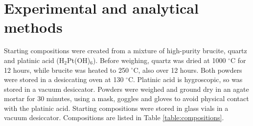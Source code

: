 \documentclass[review]{elsarticle}
\begin{document}
\section{Experimental and analytical methods}
Starting compositions were created from a mixture of high-purity brucite, quartz and platinic acid (H$_2$Pt(OH)$_6$). Before weighing, quartz was dried at 1000 $^{\circ}$C for 12 hours, while brucite was heated to 250 $^{\circ}$C, also over 12 hours. Both powders were stored in a desiccating oven at 130 $^{\circ}$C. Platinic acid is hygroscopic, so was stored in a vacuum desiccator. Powders were weighed and ground dry in an agate mortar for 30 minutes, using a mask, goggles and gloves to avoid physical contact with the platinic acid. Starting compositions were stored in glass vials in a vacuum desiccator. Compositions are listed in Table \ref{table:compositions}.
\end{document}
